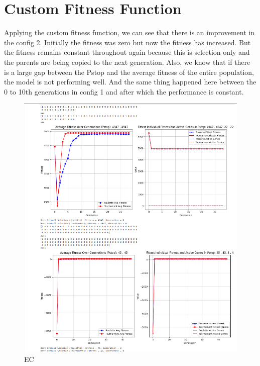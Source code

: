 \documentclass{article}
\begin{document}
\section*{Custom Fitness Function}
	Applying the custom fitness function, we can see that there is an improvement in the config 2. Initially the fitness was zero but now the fitness has increased. But the fitness remains constant throughout again because this is selection only and the parents are being copied to the next generation. Also, we know that if there is a large gap between the Pstop and the average fitness of the entire population, the model is not performing well. And the same thing happened here between the 0 to 10th generations in config 1 and after which the performance is constant.
 \begin{figure}[h]
    \centering
    \includegraphics[width=0.5\linewidth]{q2.png}
    \caption{EC}
    \label{fig:enter-label}
\end{figure}
\end{document}

